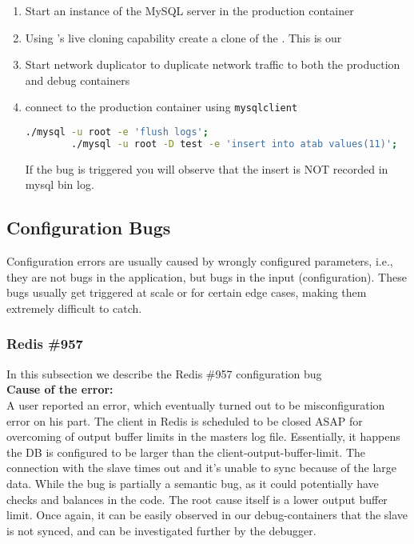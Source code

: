 \begin{adjustwidth}{0.5cm}{}
	\begin{enumerate}
		\item Start an instance of the MySQL server in the production container
		\item Using \parikshan's live cloning capability create a clone of the \productioncontainer. This is our \debugcontainer
		\item Start network duplicator to duplicate network traffic to both the production and debug containers
		\item connect to the production container using \texttt{mysqlclient}
		
		\begin{lstlisting}[language=sh]
		./mysql -u root -e 'flush logs';
		./mysql -u root -D test -e 'insert into atab values(11)';
		\end{lstlisting}
		
		If the bug is triggered you will observe that the insert is NOT recorded in mysql bin log.
		
	\end{enumerate}
\end{adjustwidth}	


\subsection{Configuration Bugs}
Configuration errors are usually caused by wrongly configured parameters, i.e., they are not bugs in the application, but bugs in the input (configuration).
These bugs usually get triggered at scale or for certain edge cases, making them extremely difficult to catch.


\subsubsection{Redis \#957}

In this subsection we describe the Redis \#957 configuration bug \\

\noindent \textbf{Cause of the error:} \\

A user reported an error, which eventually turned out to be misconfiguration error on his part.
The client in Redis is scheduled to be closed ASAP for overcoming of output buffer limits in the masters log file.
Essentially, it happens the DB is configured to be larger than the client-output-buffer-limit.
The connection with the slave times out and it's unable to sync because of the large data.
While the bug is partially a semantic bug, as it could potentially have checks and balances in the code. 
The root cause itself is a lower output buffer limit.
Once again, it can be easily observed in our debug-containers that the slave is not synced, and can be investigated further by the debugger.

